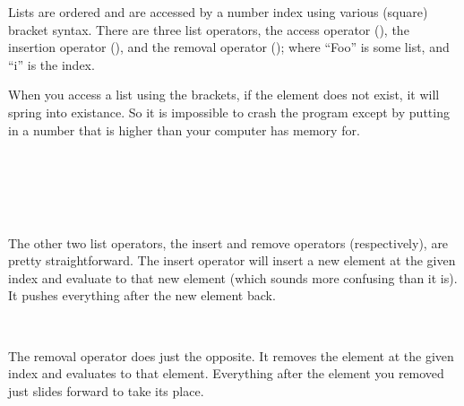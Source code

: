 \documentclass{book}
\begin{document}
Lists are ordered and are accessed by a number index using various (square) bracket syntax.  There are three list operators, the access operator (), the insertion operator (), and the removal operator (); where ``Foo'' is some list, and ``i'' is the index.  

When you access a list using the brackets, if the element does not exist, it will spring into existance.  So it is impossible to crash the program except by putting in a number that is higher than your computer has memory for.

\begin{SSCodeBox}
\scitea{, }
\scitea{, }
\scitea{;} \\
\scitea{ Foo[}
\scitea{]; }
\scitea{} \\
\scitea{ Foo[}
\scitea{]; }
\scitea{} \\
\scitea{} \\
\scitea{Foo[}
\scitea{] = }
\scitea{; }
\end{SSCodeBox}

The other two list operators, the insert and remove operators (respectively), are pretty straightforward.  The insert operator will insert a new element at the given index and evaluate to that new element (which sounds more confusing than it is).  It pushes everything after the new element back.

\begin{SSCodeBox}
\scitea{, }
\scitea{, }
\scitea{);} \\
\scitea{Foo+[}
\scitea{] = }
\scitea{; }
\end{SSCodeBox}

The removal operator does just the opposite.  It removes the element at the given index and evaluates to that element.  Everything after the element you removed just slides forward to take its place.

\begin{SSCodeBox}
\scitea{, }
\scitea{, }
\scitea{, }
\scitea{, }
\scitea{);} \\
\scitea{ Foo-[}
\scitea{]; } \\
\end{SSCodeBox}
\end{document}
